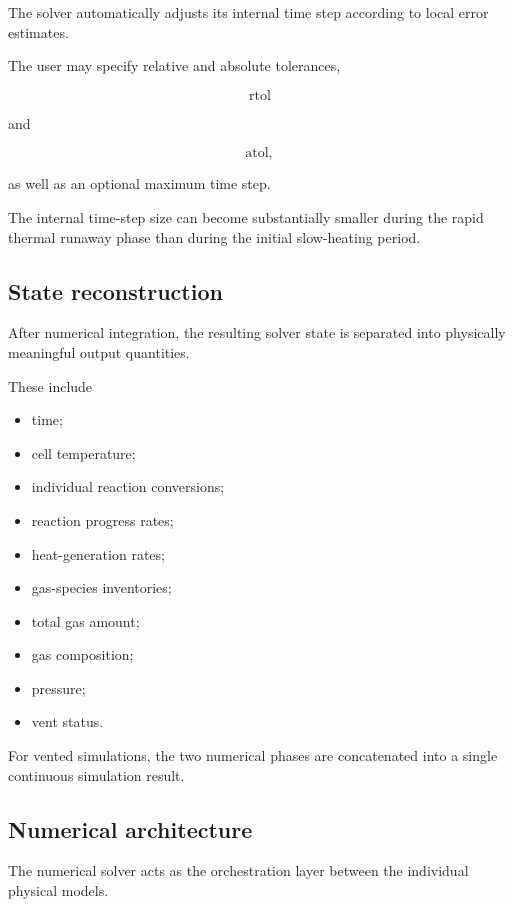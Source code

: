 The solver automatically adjusts its internal time step according to
local error estimates.

The user may specify relative and absolute tolerances,

\begin{equation}
    \mathrm{rtol}
\end{equation}

and

\begin{equation}
    \mathrm{atol},
\end{equation}

as well as an optional maximum time step.

The internal time-step size can become substantially smaller during the
rapid thermal runaway phase than during the initial slow-heating period.


\subsection{State reconstruction}

After numerical integration, the resulting solver state is separated
into physically meaningful output quantities.

These include

\begin{itemize}
    \item time;
    \item cell temperature;
    \item individual reaction conversions;
    \item reaction progress rates;
    \item heat-generation rates;
    \item gas-species inventories;
    \item total gas amount;
    \item gas composition;
    \item pressure;
    \item vent status.
\end{itemize}

For vented simulations, the two numerical phases are concatenated into a
single continuous simulation result.


\subsection{Numerical architecture}

The numerical solver acts as the orchestration layer between the
individual physical models.

